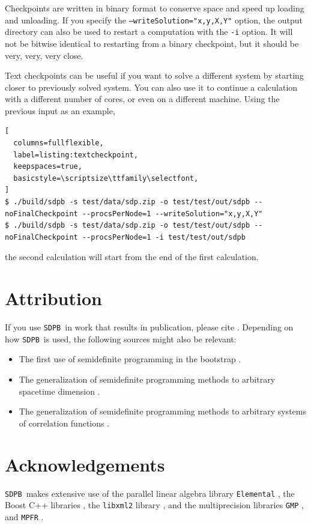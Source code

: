 \documentclass[12pt]{article}
\numberwithin{equation}{section}
\newcommand\SDPB{\texttt{SDPB}}
\begin{document}
Checkpoints are written in binary format to conserve space and speed
up loading and unloading.  If you specify the \texttt{--writeSolution="x,y,X,Y"}
option, the output directory can also be used to restart a computation
with the \texttt{-i} option.  It will not be bitwise identical to
restarting from a binary checkpoint, but it should be very, very, very
close.

Text checkpoints can be useful if you want to solve a different system
by starting closer to previously solved system.  You can also use it
to continue a calculation with a different number of cores, or even on
a different machine.  Using the previous input as an example,

\begin{lstlisting}[
  columns=fullflexible,
  label=listing:textcheckpoint,
  keepspaces=true,
  basicstyle=\scriptsize\ttfamily\selectfont,
]
$ ./build/sdpb -s test/data/sdp.zip -o test/test/out/sdpb --noFinalCheckpoint --procsPerNode=1 --writeSolution="x,y,X,Y"
$ ./build/sdpb -s test/data/sdp.zip -o test/test/out/sdpb --noFinalCheckpoint --procsPerNode=1 -i test/test/out/sdpb
\end{lstlisting}
the second calculation will start from the end of the first calculation.

\section{Attribution}

If you use \SDPB\ in work that results in publication, please cite \cite{DSD}. Depending on how \SDPB\ is used, the following sources might also be relevant:
\begin{itemize}
\item The first use of semidefinite programming in the bootstrap \cite{Poland:2011ey}.
\item The generalization of semidefinite programming methods to arbitrary
spacetime dimension \cite{Kos:2013tga}.
\item The generalization of semidefinite programming methods to arbitrary
systems of correlation functions \cite{Kos:2014bka}.
\end{itemize}

\section{Acknowledgements}

\SDPB\ makes extensive use of the parallel linear algebra library
\texttt{Elemental} \cite{Elemental}, the Boost C++
libraries \cite{BoostSite}, the \texttt{libxml2} library
\cite{libxml2}, and the multiprecision libraries \texttt{GMP}
\cite{GMP}, and \texttt{MPFR}
\cite{MPFR}.
\end{document}
